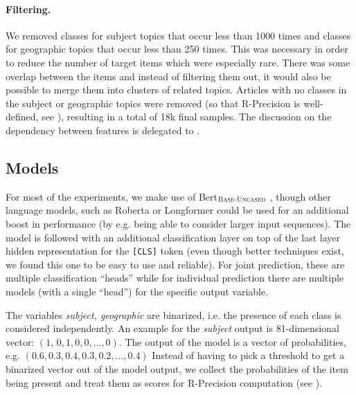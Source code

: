 \paragraph{Filtering.}
We removed classes for subject topics that occur less than 1000 times and classes for geographic topics that occur less than 250 times.
This was necessary in order to reduce the number of target items which were especially rare.
There was some overlap between the items and instead of filtering them out, it would also be possible to merge them into clusters of related topics.
Articles with no classes in the subject or geographic topics were removed (so that R-Precision is well-defined, see ), resulting in a total of 18k final samples.
The discussion on the dependency between features is delegated to .

\subsection{Models}

For most of the experiments, we make use of Bert$_\textsc{Base-Uncased}$ \cite{bert}, though other language models, such as Roberta \cite{roberta} or Longformer \cite{longformer} could be used for an additional boost in performance (by e.g. being able to consider larger input sequences).
The model is followed with an additional classification layer on top of the last layer hidden representation for the \texttt{[CLS]} token (even though better techniques exist, we found this one to be easy to use and reliable).
For joint prediction, these are multiple classification ``heads'' while for individual prediction there are multiple models (with a single ``head'') for the specific output variable.

The variables \emph{subject, geographic} are binarized, i.e. the presence of each class is considered independently.
An example for the \emph{subject} output is 81-dimensional vector: $(1,\, 0, 1, 0, 0, \ldots, 0)$.
The output of the model is a vector of probabilities, e.g. $(0.6, 0.3, 0.4, 0.3, 0.2, \ldots, 0.4)$ 
Instead of having to pick a threshold to get a binarized vector out of the model output, we collect the probabilities of the item being present and treat them as scores for R-Precision computation (see ).

